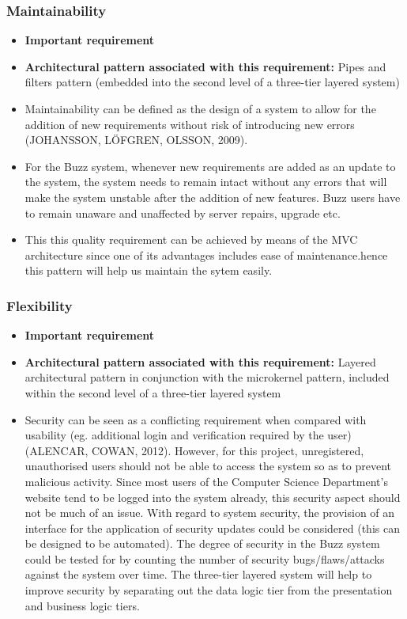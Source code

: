 \documentclass[a4paper]{article}
\begin{document}
\subsubsection{Maintainability}
\begin{itemize}
	\item \textbf{Important requirement}
	\item \textbf{Architectural pattern associated with this requirement:}  Pipes and filters pattern (embedded into the second level of a three-tier layered system)
	\item Maintainability can be defined as the design of a system to allow for the addition of new requirements without risk of introducing new errors (JOHANSSON, LÖFGREN, OLSSON, 2009). 
	\item For the Buzz system, whenever new requirements are added as an update to the system, the system needs to remain intact without any
errors that will make the system unstable after the addition of new features. Buzz users have to remain unaware and unaffected by server repairs, upgrade etc. 
\item This this quality requirement can be achieved by means of the MVC architecture since one of its advantages includes ease of maintenance.hence this pattern will help us maintain the sytem easily.

\end{itemize}


\subsubsection{Flexibility}
\begin{itemize}
	\item \textbf{Important requirement}
	\item \textbf{Architectural pattern associated with this requirement:} Layered
		architectural pattern in conjunction with the microkernel pattern, included within the second level of a three-tier layered system
	\item Security can be seen as a conflicting requirement when compared with usability (eg. additional login and verification required by the user) (ALENCAR, COWAN, 2012). However, for this project, unregistered, unauthorised users should not be able to access the system so as to prevent malicious activity. Since most users of the Computer Science Department’s website tend to be logged into the system already, this security aspect should not be much of an issue. With regard to system security, the provision of an interface for the application of security updates could be considered (this can be designed to be automated). The degree of security in the Buzz system could be tested for by counting the number of security bugs/flaws/attacks against the system over time. The three-tier layered system will help to improve security by separating out the data logic tier from the presentation and business logic tiers.
\end{itemize}
\end{document}
